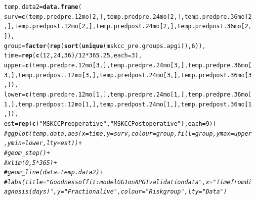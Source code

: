 \documentclass{article}\usepackage[]{graphicx}\usepackage[]{color}
\makeatletter
\newcommand{\hlnum}[1]{\textcolor[rgb]{0.686,0.059,0.569}{#1}}%
\newcommand{\hlstr}[1]{\textcolor[rgb]{0.192,0.494,0.8}{#1}}%
\newcommand{\hlcom}[1]{\textcolor[rgb]{0.678,0.584,0.686}{\textit{#1}}}%
\newcommand{\hlopt}[1]{\textcolor[rgb]{0,0,0}{#1}}%
\newcommand{\hlstd}[1]{\textcolor[rgb]{0.345,0.345,0.345}{#1}}%
\newcommand{\hlkwb}[1]{\textcolor[rgb]{0.69,0.353,0.396}{#1}}%
\newcommand{\hlkwc}[1]{\textcolor[rgb]{0.333,0.667,0.333}{#1}}%
\newcommand{\hlkwd}[1]{\textcolor[rgb]{0.737,0.353,0.396}{\textbf{#1}}}%
\newenvironment{kframe}{%
 \def\at@end@of@kframe{}%
 \ifinner\ifhmode%
  \def\at@end@of@kframe{\end{minipage}}%
  \begin{minipage}{\columnwidth}%
 \fi\fi%
 \def\FrameCommand##1{\hskip\@totalleftmargin \hskip-\fboxsep
 \colorbox{shadecolor}{##1}\hskip-\fboxsep
     \hskip-\linewidth \hskip-\@totalleftmargin \hskip\columnwidth}%
 \MakeFramed {\advance\hsize-\width
   \@totalleftmargin\z@ \linewidth\hsize
   \@setminipage}}%
 {\par\unskip\endMakeFramed%
 \at@end@of@kframe}
\newenvironment{knitrout}{}{} %
\makeatother
\begin{document}
\begin{knitrout}
\begin{kframe}
\begin{alltt}
\hlstd{temp.data2} \hlkwb{=} \hlkwd{data.frame}\hlstd{(}
        \hlkwc{surv} \hlstd{=} \hlkwd{c}\hlstd{(temp.predpre.12mo[}\hlnum{2}\hlstd{,], temp.predpre.24mo[}\hlnum{2}\hlstd{,], temp.predpre.36mo[}\hlnum{2}\hlstd{,], temp.predpost.12mo[}\hlnum{2}\hlstd{,], temp.predpost.24mo[}\hlnum{2}\hlstd{,], temp.predpost.36mo[}\hlnum{2}\hlstd{,]),}
        \hlkwc{group} \hlstd{=} \hlkwd{factor}\hlstd{(}\hlkwd{rep}\hlstd{(}\hlkwd{sort}\hlstd{(}\hlkwd{unique}\hlstd{(mskcc_pre.groups.apgi)),} \hlnum{6}\hlstd{)),}
        \hlkwc{time} \hlstd{=} \hlkwd{rep}\hlstd{(}\hlkwd{c}\hlstd{(}\hlnum{12}\hlstd{,} \hlnum{24}\hlstd{,} \hlnum{36}\hlstd{)}\hlopt{/}\hlnum{12}\hlopt{*}\hlnum{365.25}\hlstd{,} \hlkwc{each} \hlstd{=} \hlnum{3}\hlstd{),}
        \hlkwc{upper} \hlstd{=} \hlkwd{c}\hlstd{(temp.predpre.12mo[}\hlnum{3}\hlstd{,], temp.predpre.24mo[}\hlnum{3}\hlstd{,], temp.predpre.36mo[}\hlnum{3}\hlstd{,], temp.predpost.12mo[}\hlnum{3}\hlstd{,], temp.predpost.24mo[}\hlnum{3}\hlstd{,], temp.predpost.36mo[}\hlnum{3}\hlstd{,]),}
        \hlkwc{lower} \hlstd{=} \hlkwd{c}\hlstd{(temp.predpre.12mo[}\hlnum{1}\hlstd{,], temp.predpre.24mo[}\hlnum{1}\hlstd{,], temp.predpre.36mo[}\hlnum{1}\hlstd{,], temp.predpost.12mo[}\hlnum{1}\hlstd{,], temp.predpost.24mo[}\hlnum{1}\hlstd{,], temp.predpost.36mo[}\hlnum{1}\hlstd{,]),}
        \hlkwc{est} \hlstd{=} \hlkwd{rep}\hlstd{(}\hlkwd{c}\hlstd{(}\hlstr{"MSKCC Preoperative"}\hlstd{,} \hlstr{"MSKCC Postoperative"}\hlstd{),} \hlkwc{each} \hlstd{=} \hlnum{9}\hlstd{))}
\hlcom{# ggplot(temp.data, aes(x = time, y = surv, colour = group, fill = group, ymax = upper, ymin = lower, lty = est)) + }
\hlcom{# 	geom_step() + }
\hlcom{# 	xlim(0, 5*365) + }
\hlcom{# 	geom_line(data = temp.data2) + }
\hlcom{# 	labs(title = "Goodness of fit: model GG1 on APGI validation data", x = "Time from diagnosis (days)", y = "Fraction alive", colour = "Risk group", lty = "Data")}


\end{alltt}
\end{kframe}
\end{knitrout}
\end{document}
